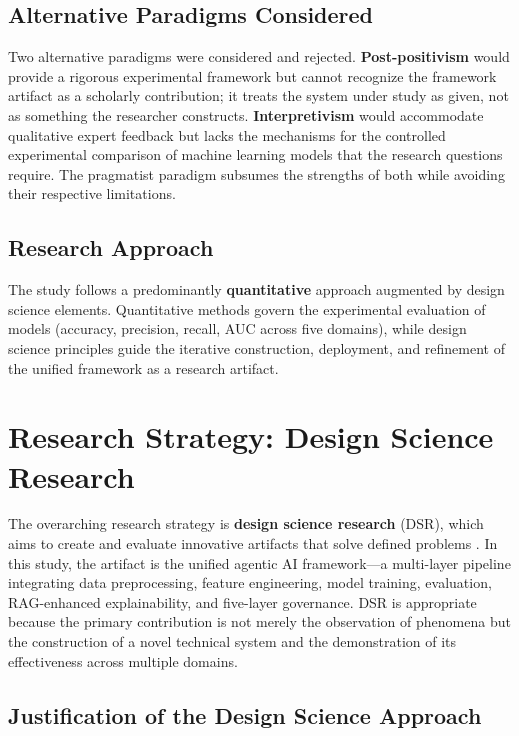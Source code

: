\subsection{Alternative Paradigms Considered}

Two alternative paradigms were considered and rejected. \textbf{Post-positivism} would provide a rigorous experimental framework but cannot recognize the framework artifact as a scholarly contribution; it treats the system under study as given, not as something the researcher constructs. \textbf{Interpretivism} would accommodate qualitative expert feedback but lacks the mechanisms for the controlled experimental comparison of machine learning models that the research questions require. The pragmatist paradigm subsumes the strengths of both while avoiding their respective limitations.

\subsection{Research Approach}

The study follows a predominantly \textbf{quantitative} approach augmented by design science elements. Quantitative methods govern the experimental evaluation of models (accuracy, precision, recall, AUC across five domains), while design science principles guide the iterative construction, deployment, and refinement of the unified framework as a research artifact.

\section{Research Strategy: Design Science Research}
\label{sec:strategy}

The overarching research strategy is \textbf{design science research} (DSR), which aims to create and evaluate innovative artifacts that solve defined problems \citep{creswell2018research}. In this study, the artifact is the unified agentic AI framework---a multi-layer pipeline integrating data preprocessing, feature engineering, model training, evaluation, RAG-enhanced explainability, and five-layer governance. DSR is appropriate because the primary contribution is not merely the observation of phenomena but the construction of a novel technical system and the demonstration of its effectiveness across multiple domains.

\subsection{Justification of the Design Science Approach}

